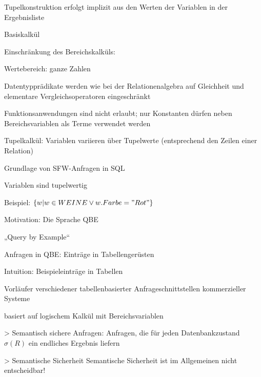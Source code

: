\documentclass[a4paper]{article}
\begin{document}
\begin{multicols}{3}
\begin{itemize*}
\begin{itemize*}
\begin{itemize*}
        \item Tupelkonstruktion erfolgt implizit aus den Werten der Variablen in der Ergebnisliste
    \end{itemize*}
    \item Basiskalkül
    \begin{itemize*}
        \item Einschränkung des Bereichskalküls:
        \begin{itemize*}
            \item Wertebereich: ganze Zahlen
            \item Datentypprädikate werden wie bei der Relationenalgebra auf Gleichheit und elementare Vergleichsoperatoren eingeschränkt
            \item Funktionsanwendungen sind nicht erlaubt; nur Konstanten dürfen neben Bereichsvariablen als Terme verwendet werden
        \end{itemize*}
        \item Tupelkalkül: Variablen variieren über Tupelwerte (entsprechend den Zeilen einer Relation)
        \begin{itemize*}
            \item Grundlage von SFW-Anfragen in SQL
            \item Variablen sind tupelwertig
            \item Beispiel: $\{w | w\in WEINE \vee w.Farbe = "Rot"\}$
        \end{itemize*}
    \end{itemize*}
\end{itemize*}

    Motivation: Die Sprache QBE
    \begin{itemize*}
        \item „Query by Example“
        \item Anfragen in QBE: Einträge in Tabellengerüsten
        \item Intuition: Beispieleinträge in Tabellen
        \item Vorläufer verschiedener tabellenbasierter Anfrageschnittstellen kommerzieller Systeme
        \item basiert auf logischem Kalkül mit Bereichsvariablen
    \end{itemize*}

    > Semantisch sichere Anfragen: Anfragen, die für jeden Datenbankzustand $\sigma(R)$ ein endliches Ergebnis liefern

    > Semantische Sicherheit Semantische Sicherheit ist im Allgemeinen nicht entscheidbar!


\end{itemize*}
\end{multicols}
\end{document}
